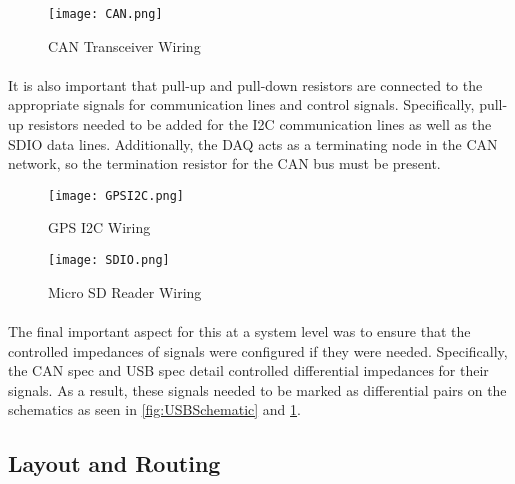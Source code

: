 \begin{figure}[H]
	\centering
	\texttt{[image: CAN.png]}
	\caption{CAN Transceiver Wiring}
	\label{fig:CANSchematic}
\end{figure}

\paragraph{}
It is also important that pull-up and pull-down resistors are connected to the appropriate signals for communication lines and control signals.
Specifically, pull-up resistors needed to be added for the I2C communication lines as well as the SDIO data lines.
Additionally, the DAQ acts as a terminating node in the CAN network, so the termination resistor for the CAN bus must be present.

\begin{figure}[H]
	\centering
	\texttt{[image: GPSI2C.png]}
	\caption{GPS I2C Wiring}
	\label{fig:I2CSchematic}
\end{figure}

\begin{figure}[H]
	\centering
	\texttt{[image: SDIO.png]}
	\caption{Micro SD Reader Wiring}
	\label{fig:SDSchematic}
\end{figure}

\paragraph{}
The final important aspect for this at a system level was to ensure that the controlled impedances of signals were configured if they were needed.
Specifically, the CAN spec and USB spec detail controlled differential impedances for their signals.
As a result, these signals needed to be marked as differential pairs on the schematics as seen in \cref{fig:USBSchematic} and \cref{fig:CANSchematic}.

\subsection{Layout and Routing}

